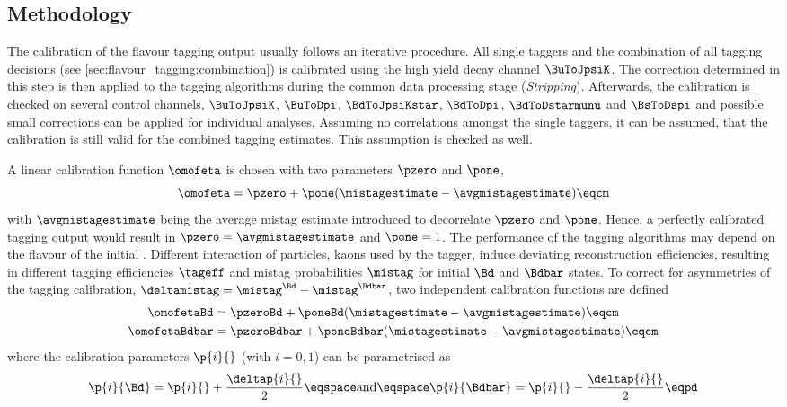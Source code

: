 \subsection{Methodology}
\label{sec:flavour_tagging:calibration:method}

The calibration of the flavour tagging output usually follows an iterative
procedure. All single taggers and the combination of all \OS tagging decisions
(see \cref{sec:flavour_tagging:combination}) is calibrated using the high yield
decay channel $\BuToJpsiK$. The correction determined in this step is then
applied to the tagging algorithms during the common data processing stage
(\emph{Stripping}). Afterwards, the calibration is checked on several control
channels, \ie $\BuToJpsiK$, $\BuToDpi$, $\BdToJpsiKstar$, $\BdToDpi$,
$\BdToDstarmunu$ and $\BsToDspi$ and possible small corrections can be applied
for individual analyses. Assuming no correlations amongst the single taggers, it
can be assumed, that the calibration is still valid for the combined tagging
estimates. This assumption is checked as well.

A linear calibration function $\omofeta$ is chosen with two parameters $\pzero$
and $\pone$,
%
\begin{equation}\label{eq:flavour_tagging:calibration:method:calibration}
  \omofeta = \pzero + \pone (\mistagestimate - \avgmistagestimate)\eqcm
\end{equation}
%
with $\avgmistagestimate$ being the average mistag estimate introduced to
decorrelate $\pzero$ and $\pone$. Hence, a perfectly calibrated tagging output
would result in $\pzero = \avgmistagestimate$ and $\pone = 1$. The performance
of the tagging algorithms may depend on the flavour of the initial \Bmeson.
Different interaction of particles, \eg kaons used by the \OSK tagger, induce
deviating reconstruction efficiencies, resulting in different tagging
efficiencies $\tageff$ and mistag probabilities $\mistag$ for initial $\Bd$ and
$\Bdbar$ states. To correct for asymmetries of the tagging calibration,
$\deltamistag = \mistag^{\Bd} - \mistag^{\Bdbar}$, two independent calibration
functions are defined
%
\begin{equation}\label{eq:flavour_tagging:calibration:method:asymmetric_calibration:omega}
  \begin{split}
    \omofetaBd    &= \pzeroBd    + \poneBd    (\mistagestimate - \avgmistagestimate)\eqcm \\
    \omofetaBdbar &= \pzeroBdbar + \poneBdbar (\mistagestimate - \avgmistagestimate)\eqcm
  \end{split}
\end{equation}
%
where the calibration parameters $\p{i}{}$ (with $i=0,1$) can be parametrised as
%
\begin{equation}\label{eq:flavour_tagging:calibration:method:asymmetric_calibration:ps}
  \p{i}{\Bd} = \p{i}{} + \frac{\deltap{i}{}}{2} \eqspace\text{and}\eqspace \p{i}{\Bdbar} = \p{i}{} - \frac{\deltap{i}{}}{2}\eqpd
\end{equation}

